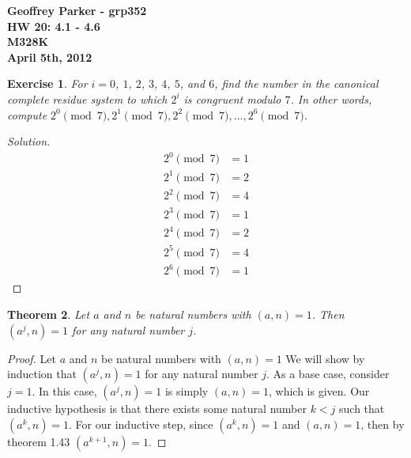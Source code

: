 \documentclass[12pt,leqno]{article}
\numberwithin{equation}{section}
\newtheorem{thm}{Theorem}[section]
\newtheorem{exer}[thm]{Exercise}
\theoremstyle{definition}
\begin{document}
\thispagestyle{plain}
\begin{flushright}
\large{\textbf{Geoffrey Parker - grp352 \\
HW 20: 4.1 - 4.6\\
M328K \\
April 5th, 2012 \\}}
\end{flushright}

\markboth{}{} \setcounter{section}{0} \baselineskip=18pt

\setcounter{tocdepth}{4}



\setcounter{section}{4}

\setcounter{thm}{0}


\begin{exer}For $i = 0$, $1$, $2$, $3$, $4$, $5$, and $6$,
find the number in the canonical complete residue
system to which
$2^i$ is congruent modulo $7$.  In other words, compute
$2^0\pmod{7}, 2^1\pmod{7}, 2^2\pmod{7}, \dots, 2^6\pmod{7}$.
\end{exer}
\begin{proof}[Solution]
\begin{align*}
2^0\pmod{7} &= 1\\
2^1\pmod{7} &= 2\\
2^2\pmod{7} &= 4\\
2^3\pmod{7} &= 1\\
2^4\pmod{7} &= 2\\
2^5\pmod{7} &= 4\\
2^6\pmod{7} &= 1
\end{align*}
\end{proof}


\begin{thm}
Let $a$ and $n$ be natural numbers with $(a, n) = 1$.  Then $(a^j,
n) = 1$ for any natural number $j$.
\end{thm}
\begin{proof}[Proof]
Let $a$ and $n$ be natural numbers with $(a, n) = 1$ We will show by induction that $(a^j,n) = 1$ for any natural number $j$.
As a base case, consider $j = 1$.  In this case, $(a^j,n) = 1$ is simply $(a, n) = 1$, which is given.
Our inductive hypothesis is that there exists some natural number $k<j$ such that $(a^k,n) = 1$.
For our inductive step, since $(a^k,n) = 1$ and $(a, n) = 1$, then by theorem 1.43 $(a^{k+1},n) = 1$.

\end{proof}
\end{document}
